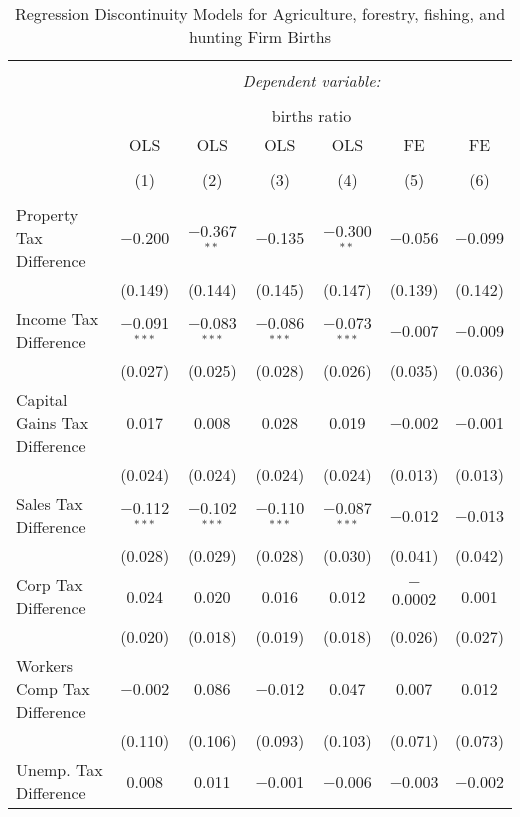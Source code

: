 
\begin{table}[!htbp] \centering 
  \caption{Regression Discontinuity Models for  Agriculture, forestry, fishing, and hunting Firm Births} 
  \label{11rd} 
\begin{tabular}{@{\extracolsep{5pt}}lcccccc} 
\\[-1.8ex]\hline 
\hline \\[-1.8ex] 
 & \multicolumn{6}{c}{\textit{Dependent variable:}} \\ 
\cline{2-7} 
\\[-1.8ex] & \multicolumn{6}{c}{births ratio} \\ 
 & OLS & OLS & OLS & OLS & FE & FE \\ 
\\[-1.8ex] & (1) & (2) & (3) & (4) & (5) & (6)\\ 
\hline \\[-1.8ex] 
 Property Tax Difference & $-$0.200 & $-$0.367$^{**}$ & $-$0.135 & $-$0.300$^{**}$ & $-$0.056 & $-$0.099 \\ 
  & (0.149) & (0.144) & (0.145) & (0.147) & (0.139) & (0.142) \\ 
  Income Tax Difference & $-$0.091$^{***}$ & $-$0.083$^{***}$ & $-$0.086$^{***}$ & $-$0.073$^{***}$ & $-$0.007 & $-$0.009 \\ 
  & (0.027) & (0.025) & (0.028) & (0.026) & (0.035) & (0.036) \\ 
  Capital Gains Tax Difference & 0.017 & 0.008 & 0.028 & 0.019 & $-$0.002 & $-$0.001 \\ 
  & (0.024) & (0.024) & (0.024) & (0.024) & (0.013) & (0.013) \\ 
  Sales Tax Difference & $-$0.112$^{***}$ & $-$0.102$^{***}$ & $-$0.110$^{***}$ & $-$0.087$^{***}$ & $-$0.012 & $-$0.013 \\ 
  & (0.028) & (0.029) & (0.028) & (0.030) & (0.041) & (0.042) \\ 
  Corp Tax Difference & 0.024 & 0.020 & 0.016 & 0.012 & $-$0.0002 & 0.001 \\ 
  & (0.020) & (0.018) & (0.019) & (0.018) & (0.026) & (0.027) \\ 
  Workers Comp Tax Difference & $-$0.002 & 0.086 & $-$0.012 & 0.047 & 0.007 & 0.012 \\ 
  & (0.110) & (0.106) & (0.093) & (0.103) & (0.071) & (0.073) \\ 
  Unemp. Tax Difference & 0.008 & 0.011 & $-$0.001 & $-$0.006 & $-$0.003 & $-$0.002 \\ 

\end{tabular}
\end{table}
